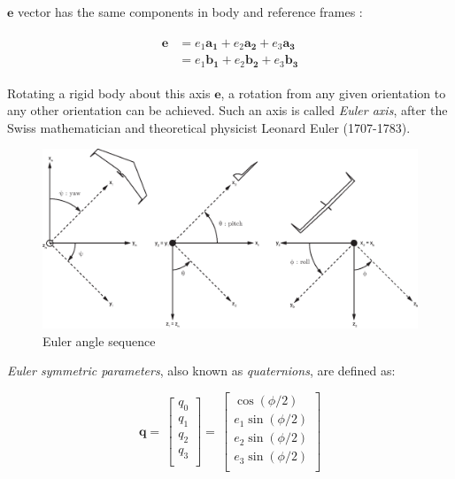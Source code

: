 $\bm{e}$ vector has the same components in body and reference frames :

\begin{align}
\label{eqn:quat2}
\begin{split}
\bm{e} & = e_1 \bm{a_1} + e_2 \bm{a_2} + e_3 \bm{a_3}
\\
& = e_1 \bm{b_1} + e_2 \bm{b_2} + e_3 \bm{b_3}
\end{split}
\end{align}
 
Rotating a rigid body about this axis $\bm{e}$, a rotation from any given orientation to any other orientation can be achieved. 
Such an axis is called  \emph{Euler axis}, after the Swiss mathematician and theoretical physicist Leonard Euler (1707-1783).

\begin{landscape}
\begin{figure}
\begin{center}
\includegraphics[width=23cm]{figures/ZagiEulerAngleSequence}
\caption{Euler angle sequence \cite{ducard2009fault}} 
\label{fig:eulerAngSequence}
\end{center}
\end{figure}
\end{landscape}

\emph{Euler symmetric parameters}, also known as \emph{quaternions}, are defined as:
 
 \begin{equation}
 \label{eqn:quat3}
\bm{q}
=\,
\begin{bmatrix}
q_0\\[0.3em]
q_1\\[0.3em]
q_2\\[0.3em]
q_3\\[0.3em]
\end{bmatrix}
=\,
\begin{bmatrix}
\cos(\phi/2)\\[0.3em]
e_1 \sin(\phi/2)\\[0.3em]
e_2 \sin(\phi/2)\\[0.3em]
e_3 \sin(\phi/2)\\[0.3em]
\end{bmatrix}
\end{equation}
 
